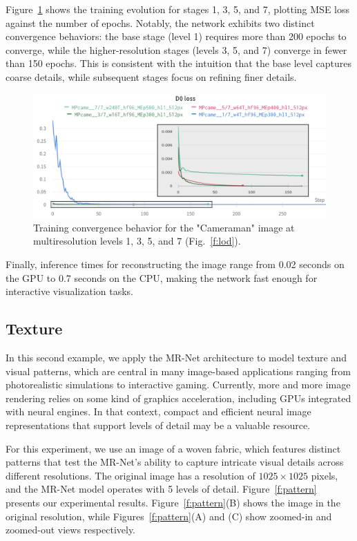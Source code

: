 Figure~\ref{f:training-epochs} shows the training evolution for stages 1, 3, 5, and 7, plotting MSE loss against the number of epochs. Notably, the network exhibits two distinct convergence behaviors: the base stage (level 1) requires more than 200 epochs to converge, while the higher-resolution stages (levels 3, 5, and 7) converge in fewer than 150 epochs. This is consistent with the intuition that the base level captures coarse details, while subsequent stages focus on refining finer details.

\begin{figure}[!h]
\centering
\includegraphics[width=\linewidth]{img/ch5/stages-training-epochs.png}
\caption{Training convergence behavior for the "Cameraman" image at multiresolution levels 1, 3, 5, and 7 (Fig.~\ref{f:lod}).}
\label{f:training-epochs}
\end{figure}


Finally, inference times for reconstructing the image range from 0.02 seconds on the GPU to 0.7 seconds on the CPU, making the network fast enough for interactive visualization tasks.

\subsection{Texture}

In this second example, we apply the MR-Net architecture to model texture and visual patterns, which are central in many image-based applications ranging from photorealistic simulations to interactive gaming. Currently, more and more image rendering relies on some kind of graphics acceleration, including GPUs integrated with neural engines. In that context, compact and efficient neural image representations that support levels of detail may be a valuable resource.

For this experiment, we use an image of a woven fabric, which features distinct patterns that test the MR-Net's ability to capture intricate visual details across different resolutions. The original image has a resolution of \(1025 \times 1025\) pixels, and the MR-Net model operates with 5 levels of detail. Figure~\ref{f:pattern} presents our experimental results. Figure~\ref{f:pattern}(B) shows the image in the original resolution, while Figures~\ref{f:pattern}(A) and (C) show zoomed-in and zoomed-out views respectively.

